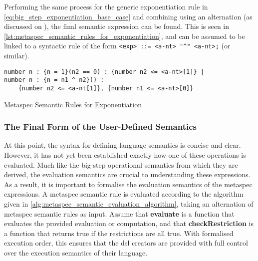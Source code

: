 Performing the same process for the generic exponentiation rule in \autoref{eq:big_step_exponentiation_base_case} and combining using an alternation (as discussed on ), the final semantic expression can be found.
This is seen in \autoref{lst:metaspec_semantic_rules_for_exponentiation}, and can be assumed to be linked to a syntactic rule of the form \texttt{<exp> ::= <a-nt> "^" <a-nt>;} (or similar).

\begin{listing}[!htb]
\begin{verbatim}
number n : {n = 1}(n2 == 0) : {number n2 <= <a-nt>[1]} |
number n : {n = n1 ^ n2}() : 
    {number n2 <= <a-nt[1]}, {number n1 <= <a-nt>[0]}
\end{verbatim}
\caption{Metaspec Semantic Rules for Exponentiation}
\label{lst:metaspec_semantic_rules_for_exponentiation}
\end{listing}



\subsubsection{The Final Form of the User-Defined Semantics} %
\label{ssub:the_final_form_of_the_user_defined_semantics}
At this point, the syntax for defining language semantics is concise and clear.
However, it has not yet been established exactly how one of these operations is evaluated.
Much like the big-step operational semantics from which they are derived, the evaluation semantics are crucial to understanding these expressions. \\

As a result, it is important to formalise the evaluation semantics of the metaspec expressions. 
A metaspec semantic rule is evaluated according to the algorithm given in \autoref{alg:metaspec_semantic_evaluation_algorithm}, taking an alternation of metaspec semantic rules as input.
Assume that \textbf{evaluate} is a function that evaluates the provided evaluation or computation, and that \textbf{checkRestriction} is a function that returns true if the restrictions are all true.
With formalised execution order, this ensures that the \gls{dsl} creators are provided with full control over the execution semantics of their language.

